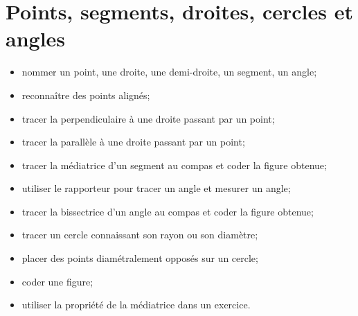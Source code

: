 \chapter{Points, segments, droites, cercles et angles}\label{ChDroitesAngles}

\begin{acquis}
\begin{itemize}
\item nommer un point, une droite, une demi-droite, un segment, un angle;
\item reconnaître des points alignés;
\item tracer la perpendiculaire à une droite passant par un point;
\item tracer la parallèle à une droite passant par un point;
\item tracer la médiatrice d’un segment au compas et coder la figure obtenue;
\item utiliser le rapporteur pour tracer un angle et mesurer un angle;
\item tracer la bissectrice d’un angle au compas et coder la figure obtenue;
\item tracer un cercle connaissant son rayon ou son diamètre;
\item placer des points diamétralement opposés sur un cercle;
\item coder une figure;
\item utiliser la propriété de la médiatrice dans un exercice.
\end{itemize}
\end{acquis} 

\activites


\cours


\exercicesbase
\begin{colonne*exercice}

\end{colonne*exercice}


\exercicesappr
\begin{colonne*exercice}

\end{colonne*exercice}

\connaissances


%

\pagebreak

\Recreation
%


